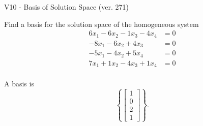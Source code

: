 \begin{exercise}
  \begin{exerciseTitle}V10 - Basis of Solution Space (ver. 271)\end{exerciseTitle}
  \begin{exerciseStatement}
    Find a basis for the solution space of the homogeneous system 
\begin{align*}
 6 x_ 1 -6 x_ 2 -1 x_ 3 -4 x_ 4 &= 0  \\ 
  -8 x_ 1 -6 x_ 2 + 4 x_ 3 &= 0  \\ 
  -5 x_ 1 -4 x_ 2 + 5 x_ 4 &= 0  \\ 
  7 x_ 1 + 1 x_ 2 -4 x_ 3 + 1 x_ 4 &= 0  \\ 
 \end{align*}


 
  \end{exerciseStatement}

  \begin{exerciseAnswer}
   A basis is   
\[\left\{\left[\begin{array}{c}
1 \\
0 \\
2 \\
1
\end{array}\right]\right\}.\]

  


  \end{exerciseAnswer}
\end{exercise}